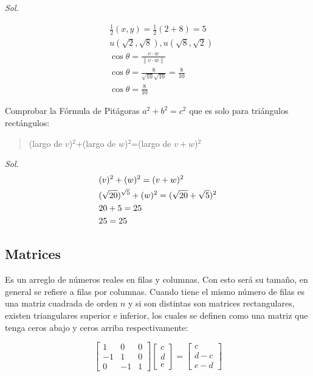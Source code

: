 \textit{ Sol. }

\begin{align*}
	 & \frac{1}{2} \left( x,y \right) = \frac{1}{2}(2+8)=5               \\
	 & u(\sqrt{2} ,\sqrt{8}), u(\sqrt{8},\sqrt{2} )                      \\
	 & \cos \theta = \frac{v \cdot w}{\left\lVert v \cdot w\right\rVert} \\
	 & \cos \theta = \frac{8}{\sqrt{10} \sqrt{10}} =\frac{8}{10}         \\
	 & \cos \theta = \frac{8}{10}
\end{align*}

\begin{problem}[El paralelogramo con lados $v = (4,2)$ y $w = (-1,2)$ es un rectángulo.]
Comprobar la
Fórmula de Pitágoras $a^2  + b^2  = c^2 $ que es solo para triángulos rectángulos:
\begin{quotation}
	(largo de $v$)$^2 $+(largo de $w$)$^2 $=(largo de $v+w$)$^2 $
\end{quotation}
\end{problem}

\textit{ Sol. }
\begin{align*}
	\centering
	 & (v)^2 +(w)^2 =(v+w)^2                                \\
	 & (\sqrt{20})^{\sqrt{5}}+(w)^2 =(\sqrt{20}+\sqrt{5})^2 \\
	 & 20+5=25                                              \\
	 & 25=25
\end{align*}

\subsection{Matrices}

Es un arreglo de números reales en filas y columnas. Con esto
será su tamaño, en general se refiere a filas por columnas. Cuando tiene el mismo número de filas es
una matriz cuadrada de orden $n$ y si son distintas son matrices rectangulares, existen triangulares superior e inferior, los cuales
se definen como una matriz que tenga ceros abajo y ceros arriba respectivamente:

\[\begin{bmatrix} 1 & 0 & 0\\ -1 & 1 & 0 \\ 0 &-1 & 1 \end{bmatrix} \begin{bmatrix} c\\ d\\ e \end{bmatrix}=\begin{bmatrix} c\\ d-c\\ e-d \end{bmatrix}\]

